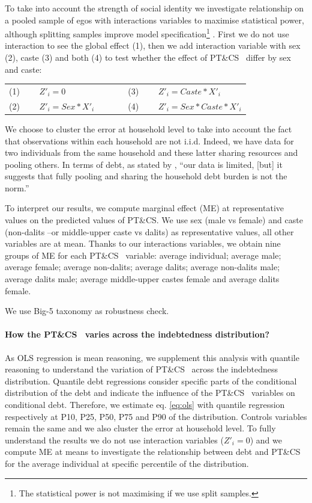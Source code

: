 \documentclass[a4paper, 11pt, onecolumn]{article}
\newcommand{\PTCS}{PT\&CS}
\begin{document}
To take into account the strength of social identity we investigate relationship on a pooled sample of egos with interactions variables to maximise statistical power, although splitting samples improve model specification\footnote{The statistical power is not maximising if we use split samples.} .
First we do not use interaction to see the global effect (1), then we add interaction variable with sex (2), caste (3) and both (4) to test whether the effect of \PTCS~ differ by sex and caste:

\begin{table}[h!]
\centering
\begin{tabular}{lllll}
(1)~~~~ $Z'_{i}=0$ & & & & (3)~~~~ $Z'_{i}=Caste*X'_{i}$ \\
(2)~~~~ $Z'_{i}=Sex*X'_{i}$ & & & & (4)~~~~ $Z'_{i}=Sex*Caste*X'_{i}$ \\
\end{tabular}%
\end{table}%

We choose to cluster the error at household level to take into account the fact that observations within each household are not i.i.d.
Indeed, we have data for two individuals from the same household and these latter sharing resources and pooling others.%
In terms of debt, as stated by \cite{Reboul2021}, ``our data is limited, [but] it suggests that fully pooling and sharing the household debt burden is not the norm.''

To interpret our results, we compute marginal effect (ME) at representative values on the predicted values of \PTCS.%
We use sex (male vs female) and caste (non-dalits --or middle-upper caste vs dalits) as representative values, all other variables are at mean.
Thanks to our interactions variables, we obtain nine groups of ME for each \PTCS~ variable: average individual; average male; average female; average non-dalits; average dalits; average non-dalits male; average dalits male; average middle-upper castes female and average dalits female. 

We use Big-5 taxonomy as robustness check.

\paragraph{How the \PTCS~ varies across the indebtedness distribution?}
As OLS regression is mean reasoning, we supplement this analysis with quantile reasoning to understand the variation of \PTCS~ across the indebtedness distribution.
Quantile debt regressions consider specific parts of the conditional distribution of the debt and indicate the influence of the \PTCS~ variables on conditional debt.
Therefore, we estimate eq. \ref{eq:ols} with quantile regression respectively at P10, P25, P50, P75 and P90 of the distribution.
Controls variables remain the same and we also cluster the error at household level.
To fully understand the results we do not use interaction variables ($Z'_{i}=0$) and we compute ME at means to investigate the relationship between debt and \PTCS~ for the average individual at specific percentile of the distribution.
\end{document}

